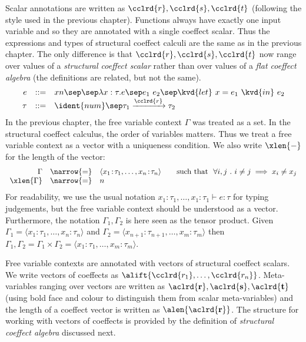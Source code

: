 Scalar annotations are written as $\cclrd{r}, \cclrd{s}, \cclrd{t}$ (following the style used in
the previous chapter). Functions always have exactly one input variable and so they are annotated
with a single coeffect scalar. Thus the expressions and types of structural coeffect calculi are the
same as in the previous chapter. The only difference is that $\cclrd{r}, \cclrd{s}, \cclrd{t}$ now
range over values of a \emph{structural coeffect scalar} rather than over values of a \emph{flat
coeffect algebra} (the definitions are related, but not the same).
%
\begin{equation*}
\begin{array}{rcl}
e &::=& x n \sep \sep \lambda x:\tau.e \sep e_1~e_2 \sep \kvd{let}~x = e_1~\kvd{in}~e_2\\
\tau &::=& \ident{num} \sep \tau_1 \xrightarrow{\cclrd{r}} \tau_2
\end{array}
\end{equation*}
%
In the previous chapter, the free variable context $\Gamma$ was treated as a set. In the
structural coeffect calculus, the order of variables matters. Thus we treat a free variable
context as a vector with a uniqueness condition. We also write $\xlen{-}$ for the length
of the vector:
%
\begin{equation*}
\begin{array}{rcl}
 \Gamma &\narrow{=}& \langle x_1\!:\!\tau_1, \ldots, x_n\!:\!\tau_n \rangle \qquad \textnormal{such that}~~\forall i, j ~.~ i \neq j \implies x_i \neq x_j\\
 \xlen{\Gamma} &\narrow{=}& n
\end{array}
\end{equation*}
%
For readability, we use the usual notation $x_1\!:\!\tau_1, \ldots, x_1\!:\!\tau_1 \vdash e : \tau$ for
typing judgements, but the free variable context should be understood as a vector.
Furthermore, the notation $\Gamma_1, \Gamma_2$ is here seen as the tensor product.
Given $\Gamma_1 = \langle x_1\!:\!\tau_1, \ldots, x_n\!:\!\tau_n \rangle $ and
$\Gamma_2 = \langle x_{n+1}\!:\!\tau_{n+1}, \ldots, x_m\!:\!\tau_m \rangle $ then
$\Gamma_1, \Gamma_2 = \Gamma_1 \times \Gamma_2 = \langle x_1\!:\!\tau_1, \ldots, x_m\!:\!\tau_m \rangle$.

Free variable contexts are annotated with vectors of structural coeffect scalars. We write vectors
of coeffects as $\alift{\cclrd{r_1}, \ldots, \cclrd{r_n}}$. Meta-variables ranging over vectors are
written as $\aclrd{\textbf{r}}, \aclrd{\textbf{s}}, \aclrd{\textbf{t}}$ (using bold face
and colour to distinguish them from scalar meta-variables) and the length of a coeffect vector
is written as $\alen{\aclrd{\textbf{r}}}$. The structure for working with vectors
of coeffects is provided by the definition of \emph{structural coeffect algebra} discussed next.

